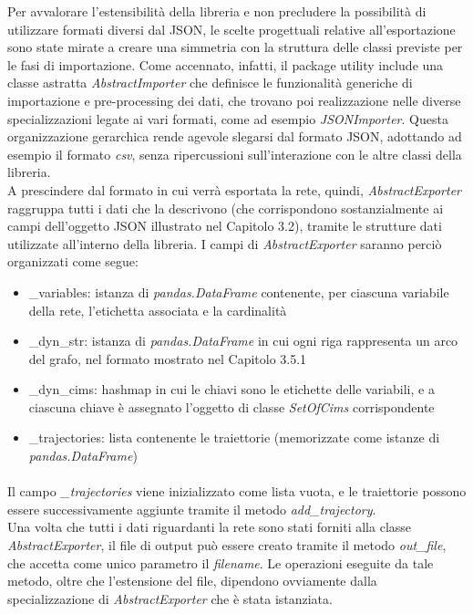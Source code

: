   Per avvalorare l'estensibilità della libreria e non precludere la possibilità di utilizzare formati 
  diversi dal JSON, le scelte progettuali relative all'esportazione sono state mirate a creare
  una simmetria con la struttura delle classi previste per le fasi di importazione.
  Come accennato, infatti, il package utility include una classe astratta \textit{AbstractImporter}
  che definisce le funzionalità generiche di importazione e pre-processing dei dati, che trovano poi
  realizzazione nelle diverse specializzazioni legate ai vari formati, come ad esempio \textit{JSONImporter}.
  Questa organizzazione gerarchica rende agevole slegarsi dal formato JSON, adottando ad esempio il formato \textit{csv}, 
  senza ripercussioni sull'interazione con le altre classi della libreria.\\
  A prescindere dal formato in cui verrà esportata la rete, quindi, \textit{AbstractExporter}
  raggruppa tutti i dati che la descrivono (che corrispondono sostanzialmente ai campi dell'oggetto JSON illustrato
  nel Capitolo 3.2), tramite le strutture dati utilizzate all'interno della libreria.
  I campi di \textit{AbstractExporter} saranno perciò organizzati come segue:

  \begin{itemize}
    \item \_variables: istanza di \textit{pandas.DataFrame} contenente, per ciascuna variabile della rete,
      l'etichetta associata e la cardinalità
    \item \_dyn\_str: istanza di \textit{pandas.DataFrame} in cui ogni riga rappresenta un arco del grafo,
      nel formato mostrato nel Capitolo 3.5.1
    \item \_dyn\_cims: hashmap in cui le chiavi sono le etichette delle variabili, e a ciascuna chiave è 
      assegnato l'oggetto di classe \textit{SetOfCims} corrispondente
    \item \_trajectories: lista contenente le traiettorie (memorizzate come istanze di \textit{pandas.DataFrame})
  \end{itemize}

  \paragraph{}
  Il campo \textit{\_trajectories} viene inizializzato come lista vuota, e le traiettorie possono essere
  successivamente aggiunte tramite il metodo \textit{add\_trajectory}.\\
  Una volta che tutti i dati riguardanti la rete sono stati forniti alla classe \textit{AbstractExporter},
  il file di output può essere creato tramite il metodo \textit{out\_file}, che accetta come
  unico parametro il \textit{filename}. Le operazioni eseguite da tale metodo, oltre che l'estensione del file,
  dipendono ovviamente dalla specializzazione di \textit{AbstractExporter} che è stata istanziata.

